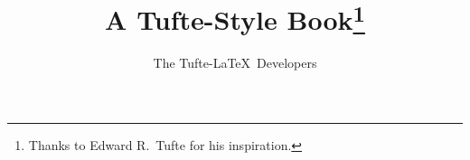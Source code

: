 \documentclass[nobib,notoc]{tufte-book}
\title{A Tufte-Style Book\thanks{Thanks to Edward R.~Tufte for his inspiration.}}
\author[The Tufte-LaTeX Developers]{The Tufte-LaTeX\ Developers}
\begin{document}
\frontmatter







\blankpage



\blankpage



\blankpage


\tableofcontents

\cleardoublepage

\mainmatter


\cleardoublepage




\cleardoublepage











\backmatter




\printindex
\end{document}
